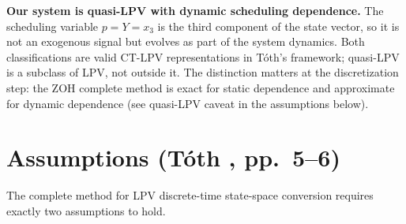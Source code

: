 \documentclass[11pt]{article}
\newcounter{assumption}
\begin{document}
\textbf{Our system is quasi-LPV with dynamic scheduling dependence.}
The scheduling variable $p = Y = x_3$ is the third component of the state vector, so it is
not an exogenous signal but evolves as part of the system dynamics. Both classifications are
valid CT-LPV representations in Tóth's framework; quasi-LPV is a subclass of LPV, not
outside it. The distinction matters at the discretization step: the ZOH complete method
is exact for static dependence and approximate for dynamic dependence (see quasi-LPV caveat
in the assumptions below).

\vspace{0.8em}

\section*{Assumptions (Tóth \cite{toth2010}, pp.~5--6)}

The complete method for LPV discrete-time state-space conversion requires exactly two
assumptions to hold.
\end{document}
